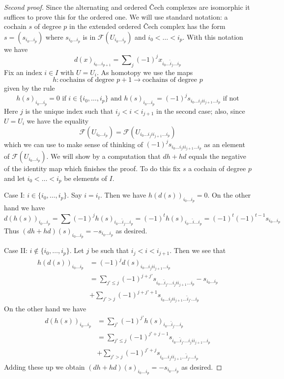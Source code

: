 \begin{proof}[Second proof]
Since the alternating and ordered {\v C}ech complexes are isomorphic
it suffices to prove this for the ordered one.
We will use standard notation: a cochain $s$ of degree $p$
in the extended ordered {\v C}ech complex has the form
$s = (s_{i_0 \ldots i_p})$ where $s_{i_0 \ldots i_p}$ is in
$\mathcal{F}(U_{i_0 \ldots i_p})$ and $i_0 < \ldots < i_p$.
With this notation we have
$$
d(x)_{i_0 \ldots i_{p + 1}} =
\sum\nolimits_j (-1)^j x_{i_0 \ldots \hat i_j \ldots i_p}
$$
Fix an index $i \in I$ with $U = U_i$.
As homotopy we use the maps
$$
h : \text{cochains of degree }p + 1 \to \text{cochains of degree }p
$$
given by the rule
$$
h(s)_{i_0 \ldots i_p} = 0 \text{ if } i \in \{i_0, \ldots, i_p\}
\text{ and }
h(s)_{i_0 \ldots i_p} = 
(-1)^j s_{i_0 \ldots i_j i i_{j + 1} \ldots i_p} \text{ if not}
$$
Here $j$ is the unique index such that $i_j < i < i_{j + 1}$ in the
second case; also, since $U = U_i$ we have the equality
$$
\mathcal{F}(U_{i_0 \ldots i_p}) =
\mathcal{F}(U_{i_0 \ldots i_j i i_{j + 1} \ldots i_p})
$$
which we can use to make sense of thinking of
$(-1)^j s_{i_0 \ldots i_j i i_{j + 1} \ldots i_p}$
as an element of $\mathcal{F}(U_{i_0 \ldots i_p})$.
We will show by a computation that $d h + h d$ equals
the negative of the identity map which finishes the proof.
To do this fix $s$ a cochain of degree $p$ and let
$i_0 < \ldots < i_p$ be elements of $I$.

\medskip\noindent
Case I: $i \in \{i_0, \ldots, i_p\}$. Say $i = i_t$. Then we have
$h(d(s))_{i_0 \ldots i_p} = 0$. On the other hand we have
$$
d(h(s))_{i_0 \ldots i_p} =
\sum (-1)^j h(s)_{i_0 \ldots \hat i_j \ldots i_p} =
(-1)^t h(s)_{i_0 \ldots \hat i \ldots i_p} =
(-1)^t (-1)^{t - 1} s_{i_0 \ldots i_p}
$$
Thus $(dh + hd)(s)_{i_0 \ldots i_p} = -s_{i_0 \ldots i_p}$ as desired.

\medskip\noindent
Case II: $i \not \in \{i_0, \ldots, i_p\}$. Let $j$ be such that
$i_j < i < i_{j + 1}$. Then we see that
\begin{align*}
h(d(s))_{i_0 \ldots i_p}
& =
(-1)^j d(s)_{i_0 \ldots i_j i i_{j + 1} \ldots i_p} \\
& =
\sum\nolimits_{j' \leq j} (-1)^{j + j'}
s_{i_0 \ldots \hat i_{j'} \ldots i_j i i_{j + 1} \ldots i_p} -
s_{i_0 \ldots i_p} \\
&
+ \sum\nolimits_{j' > j} (-1)^{j + j' + 1}
s_{i_0 \ldots i_j i i_{j + 1} \ldots \hat i_{j'} \ldots i_p}
\end{align*}
On the other hand we have
\begin{align*}
d(h(s))_{i_0 \ldots i_p}
& =
\sum\nolimits_{j'} (-1)^{j'} h(s)_{i_0 \ldots \hat i_{j'} \ldots i_p} \\
& =
\sum\nolimits_{j' \leq j} (-1)^{j' + j - 1}
s_{i_0 \ldots \hat i_{j'} \ldots i_j i i_{j + 1} \ldots i_p} \\
& +
\sum\nolimits_{j' > j} (-1)^{j' + j}
s_{i_0 \ldots i_j i i_{j + 1} \ldots \hat i_{j'} \ldots i_p}
\end{align*}
Adding these up we obtain
$(dh + hd)(s)_{i_0 \ldots i_p} = - s_{i_0 \ldots i_p}$
as desired.
\end{proof}





